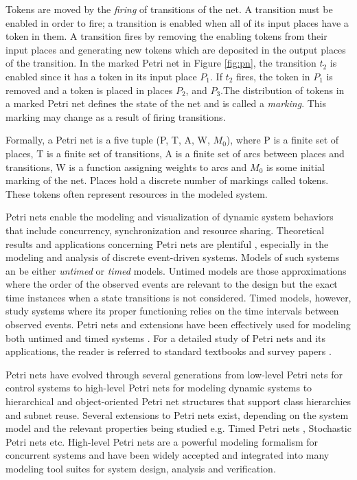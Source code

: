 Tokens are moved by the \emph{firing} of transitions of the net. A transition must be enabled in order to fire; a transition is enabled when all of its input places have a token in them. A transition fires by removing the enabling tokens from their input places and generating new tokens which are deposited in the output places of the transition. In the marked Petri net in Figure \ref{fig:pn}, the transition $t_2$ is enabled since it has a token in its input place $P_1$. If $t_2$ fires, the token in $P_1$ is removed and a token is placed in places $P_2$, and $P_3$.The distribution of tokens in a marked Petri net defines the state of the net and is called a \emph{marking}. This marking may change as a result of firing transitions. 

Formally, a Petri net is a five tuple (P, T, A, W, $M_0$), where P is a finite set of places, T is a finite set of transitions, A is a finite set of arcs between places and transitions, W is a function assigning weights to arcs and $M_0$ is some initial marking of the net. Places hold a discrete number of markings called tokens. These tokens often represent resources in the modeled system.

Petri nets enable the modeling and visualization of dynamic system behaviors that include concurrency, synchronization and resource sharing. Theoretical results and applications concerning Petri nets are plentiful \cite{david1994petri, holloway1997survey}, especially in the modeling and analysis of discrete event-driven systems. Models of such systems an be either \emph{untimed} or \emph{timed} models. Untimed models are those approximations where the order of the observed events are relevant to the design but the exact time instances when a state transitions is not considered. Timed models, however, study systems where its proper functioning relies on the time intervals between observed events. Petri nets and extensions have been effectively used for modeling both untimed \cite{holloway1997survey} and timed systems \cite{zuberek1991timed}. For a detailed study of Petri nets and its applications, the reader is referred to standard textbooks \cite{peterson1977petri, reisig2012petri} and survey papers \cite{murata1989petri, zhou1999modeling, zurawski1994petri}.

Petri nets have evolved through several generations from low-level Petri nets for control systems \cite{reisig2012petri} to high-level Petri nets for modeling dynamic systems \cite{jensen2012high} to hierarchical and object-oriented Petri net structures \cite{de2001object} that support class hierarchies and subnet reuse. Several extensions to Petri nets exist, depending on the system model and the relevant properties being studied e.g. Timed Petri nets \cite{wang2012timed}, Stochastic Petri nets \cite{bause1996stochastic, marsan1994modelling} etc. High-level Petri nets are a powerful modeling formalism for concurrent systems and have been widely accepted and integrated into many modeling tool suites for system design, analysis and verification. 

